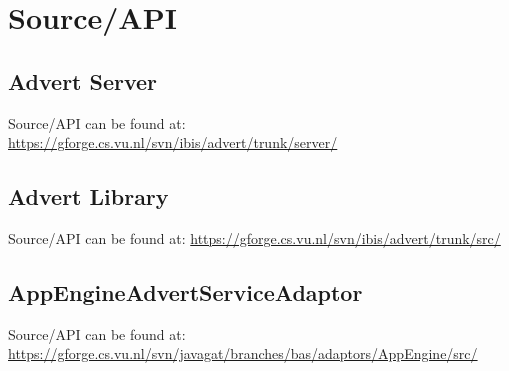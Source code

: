\section{Source/API}
\label{src-api}

\subsection{Advert Server}
Source/API can be found at:
\url{https://gforge.cs.vu.nl/svn/ibis/advert/trunk/server/}

\subsection{Advert Library}
Source/API can be found at:
\url{https://gforge.cs.vu.nl/svn/ibis/advert/trunk/src/}

\subsection{AppEngineAdvertServiceAdaptor}
Source/API can be found at:
\url{https://gforge.cs.vu.nl/svn/javagat/branches/bas/adaptors/AppEngine/src/}